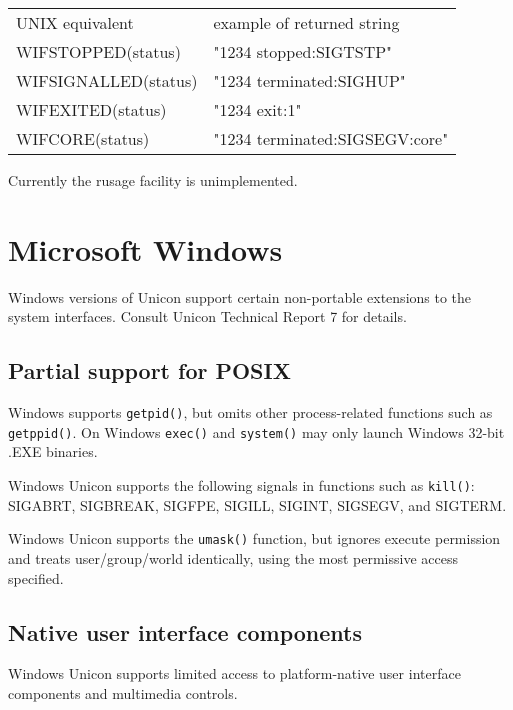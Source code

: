 \vspace{0.05in}
\begin{center}
\tablehead{}
\begin{xtabular}{m{2.4in} m{2.6in}}
 UNIX equivalent & example of returned string \\
 WIFSTOPPED(status) & "1234 stopped:SIGTSTP" \\
 WIFSIGNALLED(status) & "1234 terminated:SIGHUP" \\
 WIFEXITED(status) & "1234 exit:1" \\
 WIFCORE(status) & "1234 terminated:SIGSEGV:core" \\
\end{xtabular}
\end{center}
\vspace{0.05in}

\noindent
Currently the \textsf{rusage} facility is unimplemented.


\section{Microsoft Windows}

Windows versions of Unicon support certain non-portable extensions to
the system interfaces. Consult Unicon Technical Report 7 for details.

\subsection*{Partial support for POSIX}

Windows supports \texttt{getpid()}, but omits other
process-related functions such as \texttt{getppid()}. On Windows
\texttt{exec()} and \texttt{system()} may only launch Windows 32-bit
.EXE binaries.

Windows Unicon supports the following signals in functions such as
\texttt{kill()}: SIGABRT, SIGBREAK, SIGFPE, SIGILL, SIGINT, SIGSEGV, and
SIGTERM.

Windows Unicon supports the \texttt{umask()} function, but ignores execute
permission and treats user/group/world identically, using the most
permissive access specified.

\subsection*{Native user interface components}

Windows Unicon supports limited access to platform-native user interface
components and multimedia controls.


